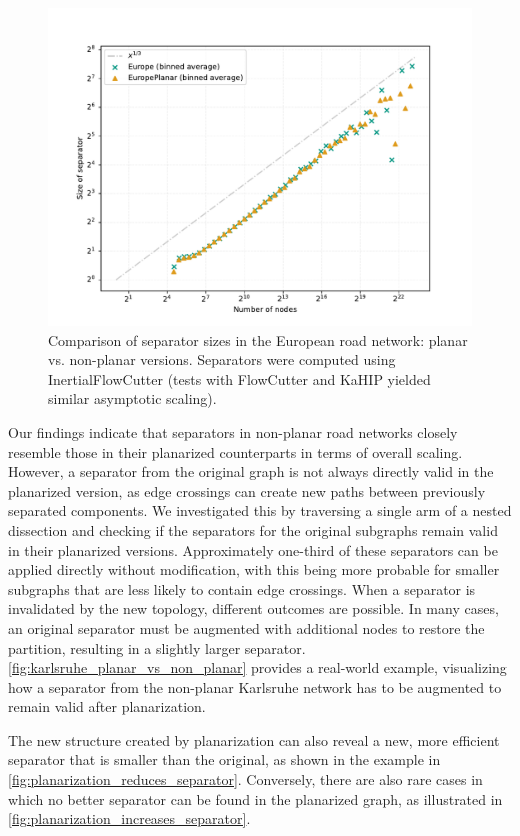 \begin{figure}[tbhp]
    \centering
    \includegraphics[width=0.8\linewidth]{graphics/EuropePlanarVsNonPlanar.pdf}
    \caption{Comparison of separator sizes in the European road network: planar vs. non-planar versions. Separators were computed using InertialFlowCutter (tests with FlowCutter and KaHIP yielded similar asymptotic scaling).}
    \label{fig:germany_planar_vs_non_planar}
\end{figure}

Our findings indicate that separators in non-planar road networks closely resemble those in their planarized counterparts in terms of overall scaling.
However, a separator from the original graph is not always directly valid in the planarized version, as edge crossings can create new paths between previously separated components.
We investigated this by traversing a single arm of a nested dissection and checking if the separators for the original subgraphs remain valid in their planarized versions.
Approximately one-third of these separators can be applied directly without modification, with this being more probable for smaller subgraphs that are less likely to contain edge crossings.
When a separator is invalidated by the new topology, different outcomes are possible.
In many cases, an original separator must be augmented with additional nodes to restore the partition, resulting in a slightly larger separator.
\cref{fig:karlsruhe_planar_vs_non_planar} provides a real-world example, visualizing how a separator from the non-planar Karlsruhe network has to be augmented to remain valid after planarization.

The new structure created by planarization can also reveal a new, more efficient separator that is smaller than the original, as shown in the example in \cref{fig:planarization_reduces_separator}.
Conversely, there are also rare cases in which no better separator can be found in the planarized graph, as illustrated in \cref{fig:planarization_increases_separator}.

